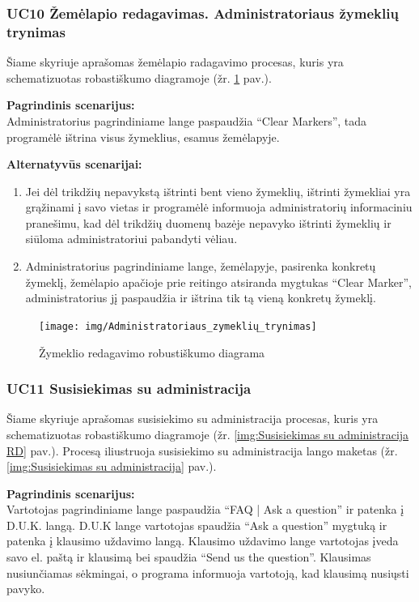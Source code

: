 \documentclass{VUMIFPSkursinis}
\begin{document}
\subsubsection{UC10 Žemėlapio redagavimas. Administratoriaus žymeklių trynimas}
	Šiame skyriuje aprašomas žemėlapio radagavimo procesas, kuris yra schematizuotas robastiškumo diagramoje (žr. \ref{img:Žymeklio radagavimo langas} pav.).

	\textbf{Pagrindinis scenarijus:}\\
	Administratorius pagrindiniame lange paspaudžia “Clear Markers”, tada programėlė ištrina visus žymeklius, esamus žemėlapyje.

	\textbf{Alternatyvūs scenarijai:}
	\begin{enumerate}[itemsep=-2mm]
		\item Jei dėl trikdžių nepavykstą ištrinti bent vieno žymeklių, ištrinti žymekliai yra grąžinami į savo vietas ir programėlė informuoja administratorių informaciniu pranešimu, kad dėl trikdžių duomenų bazėje nepavyko ištrinti žymeklių ir siūloma administratoriui pabandyti vėliau.
		\item Administratorius pagrindiniame lange, žemėlapyje, pasirenka konkretų žymeklį, žemėlapio apačioje prie reitingo atsiranda mygtukas “Clear Marker”, administratorius jį paspaudžia ir ištrina tik tą vieną konkretų žymeklį.
	\end{enumerate} 
		\begin{figure}[H]
				\centering
				\texttt{[image: img/Administratoriaus\_zymeklių\_trynimas]}
				\caption{Žymeklio redagavimo robustiškumo diagrama}
				\label{img:Žymeklio radagavimo langas}
			\end{figure}

\subsubsection{UC11 Susisiekimas su administracija}
	Šiame skyriuje aprašomas susisiekimo su administracija procesas, kuris yra schematizuotas robastiškumo diagramoje (žr. \ref{img:Susisiekimas su administracija RD} pav.). 
	Procesą iliustruoja susisiekimo su administracija lango maketas (žr. \ref{img:Susisiekimas su administracija} pav.).

	\textbf{Pagrindinis scenarijus:}\\
	Vartotojas pagrindiniame lange paspaudžia “FAQ | Ask a question” ir patenka į D.U.K. langą. D.U.K lange vartotojas 
	spaudžia “Ask a question” mygtuką ir patenka į klausimo uždavimo langą. Klausimo uždavimo lange vartotojas įveda 
	savo el. paštą ir klausimą bei spaudžia “Send us the question”. Klausimas nusiunčiamas sėkmingai, o programa informuoja 
	vartotoją, kad klausimą nusiųsti pavyko.
\end{document}
